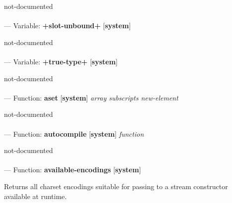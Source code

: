 \begin{adjustwidth}{5em}{5em}
not-documented
\end{adjustwidth}

\paragraph{}
\label{SYSTEM:+SLOT-UNBOUND+}
--- Variable: \textbf{+slot-unbound+} [\textbf{system}] \textit{}

\begin{adjustwidth}{5em}{5em}
not-documented
\end{adjustwidth}

\paragraph{}
\label{SYSTEM:+TRUE-TYPE+}
--- Variable: \textbf{+true-type+} [\textbf{system}] \textit{}

\begin{adjustwidth}{5em}{5em}
not-documented
\end{adjustwidth}

\paragraph{}
\label{SYSTEM:ASET}
--- Function: \textbf{aset} [\textbf{system}] \textit{array subscripts new-element}

\begin{adjustwidth}{5em}{5em}
not-documented
\end{adjustwidth}

\paragraph{}
\label{SYSTEM:AUTOCOMPILE}
--- Function: \textbf{autocompile} [\textbf{system}] \textit{function}

\begin{adjustwidth}{5em}{5em}
not-documented
\end{adjustwidth}

\paragraph{}
\label{SYSTEM:AVAILABLE-ENCODINGS}
--- Function: \textbf{available-encodings} [\textbf{system}] \textit{}

\begin{adjustwidth}{5em}{5em}
Returns all charset encodings suitable for passing to a stream constructor available at runtime.
\end{adjustwidth}

